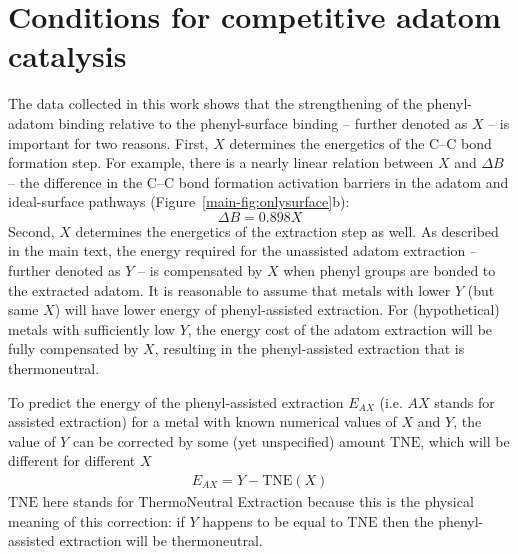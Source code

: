 \documentclass[aps,prl,reprint,amsmath,amssymb,floatfix,notitlepage]{revtex4-1}
\begin{document}
\section{Conditions for competitive adatom catalysis}


The data collected in this work shows that the strengthening of the phenyl-adatom binding relative to the phenyl-surface binding -- further denoted as $X$ -- is important for two reasons. First, $X$ determines the energetics of the C--C bond formation step. For example, there is a nearly linear relation between $X$ and $\Delta B$ -- the difference in the C--C bond formation activation barriers in the adatom and ideal-surface pathways (Figure~\ref{main-fig:onlysurface}b):
% 
\begin{equation} \label{eq:relation1}
\Delta B = 0.898 X
\end{equation}
%
Second, $X$ determines the energetics of the extraction step as well. As described in the main text, the energy required for the unassisted adatom extraction -- further denoted as $Y$ -- is compensated by $X$ when phenyl groups are bonded to the extracted adatom. It is reasonable to assume that metals with lower $Y$ (but same $X$) will have lower energy of phenyl-assisted extraction. For (hypothetical) metals with sufficiently low $Y$, the energy cost of the adatom extraction will be fully compensated by $X$, resulting in the phenyl-assisted extraction that is thermoneutral. 

To predict the energy of the phenyl-assisted extraction $E_{AX}$ (i.e. $AX$ stands for assisted extraction) for a metal with known numerical values of $X$ and $Y$, the value of $Y$ can be corrected by some (yet unspecified) amount $\text{TNE}$, which will be different for different $X$
%
\begin{equation} \label{eq:relation2}
\begin{split}
E_{AX} = Y - \text{TNE}(X)
\end{split}
\end{equation}
%
$\text{TNE}$ here stands for ThermoNeutral Extraction because this is the physical meaning of this correction: if $Y$ happens to be equal to $\text{TNE}$ then the phenyl-assisted extraction will be thermoneutral.
\end{document}

